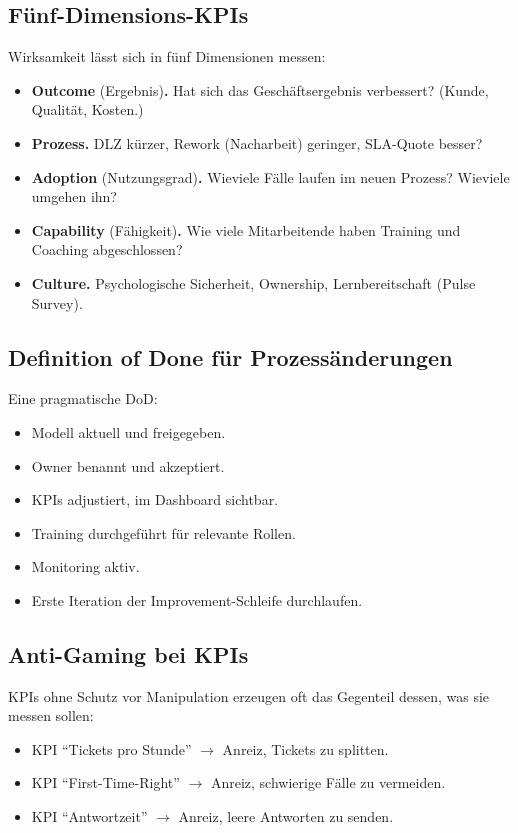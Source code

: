 \documentclass[11pt,a4paper,oneside]{article}
\newcommand{\fachbegriff}[1]{\textbf{#1}}
\begin{document}
\subsection{Fünf-Dimensions-KPIs}

Wirksamkeit lässt sich in fünf Dimensionen messen:

\begin{itemize}
  \item \fachbegriff{Outcome} (Ergebnis)\textbf{.} Hat sich das Geschäftsergebnis verbessert? (Kunde, Qualität, Kosten.)
  \item \fachbegriff{Prozess.} DLZ kürzer, Rework (Nacharbeit) geringer, SLA-Quote besser?
  \item \fachbegriff{Adoption} (Nutzungsgrad)\textbf{.} Wieviele Fälle laufen im neuen Prozess? Wieviele umgehen ihn?
  \item \fachbegriff{Capability} (Fähigkeit)\textbf{.} Wie viele Mitarbeitende haben Training und Coaching abgeschlossen?
  \item \fachbegriff{Culture.} Psychologische Sicherheit, Ownership, Lernbereitschaft (Pulse Survey).
\end{itemize}

\subsection{Definition of Done für Prozessänderungen}

Eine pragmatische DoD:

\begin{itemize}
  \item Modell aktuell und freigegeben.
  \item Owner benannt und akzeptiert.
  \item KPIs adjustiert, im Dashboard sichtbar.
  \item Training durchgeführt für relevante Rollen.
  \item Monitoring aktiv.
  \item Erste Iteration der Improvement-Schleife durchlaufen.
\end{itemize}

\subsection{Anti-Gaming bei KPIs}

KPIs ohne Schutz vor Manipulation erzeugen oft das Gegenteil dessen, was sie messen sollen:

\begin{itemize}
  \item KPI ``Tickets pro Stunde'' $\to$ Anreiz, Tickets zu splitten.
  \item KPI ``First-Time-Right'' $\to$ Anreiz, schwierige Fälle zu vermeiden.
  \item KPI ``Antwortzeit'' $\to$ Anreiz, leere Antworten zu senden.
\end{itemize}
\end{document}
